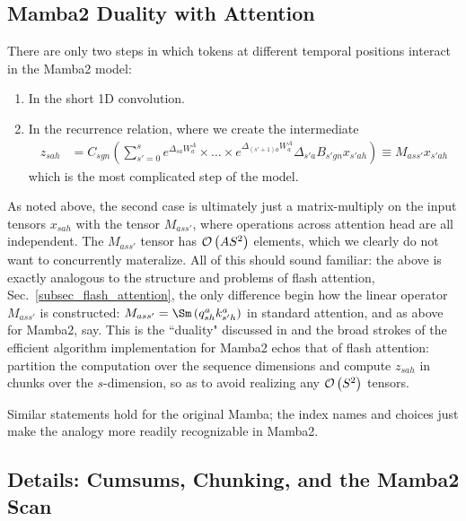 \subsection{Mamba2 Duality with Attention}

There are only two steps in which tokens at different temporal positions interact in the Mamba2
model:
\begin{enumerate}
    \item In the short 1D convolution.
    \item In the recurrence relation, where we create the intermediate
        \begin{align}
        z _{ sah } &= C _{ sgn }\left (\sum _{ s'=0 }^{ s }e^{ \Delta _{ sa }W^{A} _{ a } }\times \ldots \times e^{ \Delta _{ (s'+1)a }W^{A} _{ a } } \Delta _{ s'a }B _{ s'gn } x _{ s'ah }\right ) \equiv  M  _{ ass' }x _{ s'ah }
        \end{align}
        which is the most complicated step of the model.
\end{enumerate}

As noted above, the second case is ultimately just a matrix-multiply on the input tensors $ x _{ sah
} $ with the tensor $ M _{ ass' } $, where operations across attention head are all independent. The
$ M _{ ass' } $ tensor has $ \mathcal{O} \left( A S ^{ 2 } \right)  $ elements, which we clearly do not want
to concurrently materalize. All of this should sound familiar: the above is exactly analogous to the
structure and problems of flash attention, Sec.~\ref{subsec_flash_attention}, the only difference begin how the linear operator $ M _{
ass' } $ is constructed: $ M _{ ass' } = \Sm \left (q ^{ a }_{ sh }k ^{ a }_{ s'h } \right ) $
in standard attention, and as above for Mamba2, say. This is the ``duality" discussed in
\cite{dao2024transformersssmsgeneralizedmodels} and the broad strokes of the efficient algorithm
implementation for Mamba2 echos that of flash attention: partition the computation over the sequence
dimensions and compute $ z _{ sah } $ in chunks over the $ s $-dimension, so as to avoid realizing
any $ \mathcal{O} \left( S ^{ 2 } \right)  $ tensors.

Similar statements hold for the original Mamba; the index names and choices just make the analogy
more readily recognizable in Mamba2.

\subsection{Details: Cumsums, Chunking, and the Mamba2 Scan}

